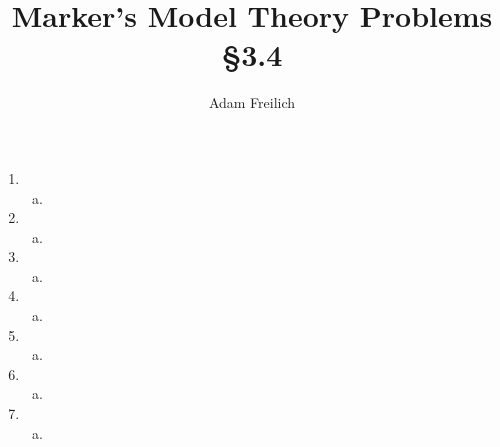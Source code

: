 \documentclass[10pt]{article}
\author{Adam Freilich}
\title{Marker's Model Theory Problems \S 3.4}
\begin{document}
\maketitle


\begin{enumerate}[1.]
\item
 
  \begin{enumerate}[a)] 
  \item 	
  \end{enumerate}

\item
 
  \begin{enumerate}[a)] 
  \item 	
  \end{enumerate}

\item
 
  \begin{enumerate}[a)] 
  \item 	
  \end{enumerate}

\item
 
  \begin{enumerate}[a)] 
  \item 	
  \end{enumerate}

\item
 
  \begin{enumerate}[a)] 
  \item 	
  \end{enumerate}

\item
 
  \begin{enumerate}[a)] 
  \item 	
  \end{enumerate}

\item
 
  \begin{enumerate}[a)] 
  \item 	
  \end{enumerate}


\end{enumerate}
\end{document}
